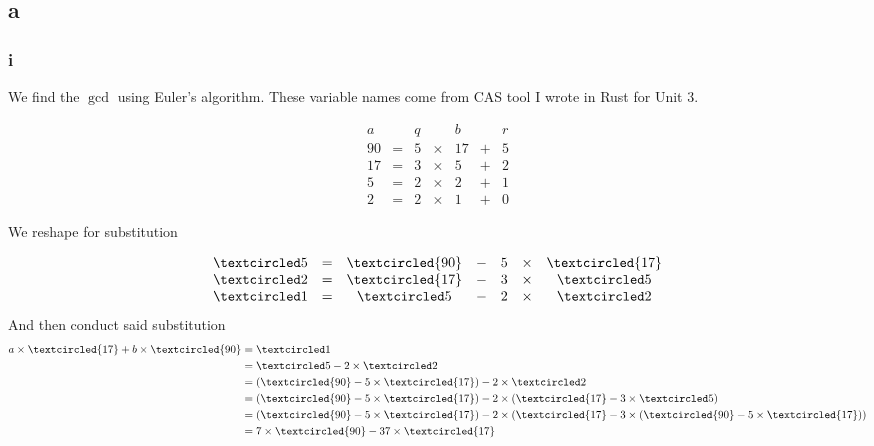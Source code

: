 \documentclass{article}
\begin{document}
\subsection{a}

\subsubsection{i}

We find the $\gcd$ using Euler's algorithm. These variable names come from CAS tool I wrote in Rust for Unit 3.

$$\begin{matrix}
		a  &   & q &        & b  &   & r \\
		90 & = & 5 & \times & 17 & + & 5 \\
		17 & = & 3 & \times & 5  & + & 2 \\
		5  & = & 2 & \times & 2  & + & 1 \\
		2  & = & 2 & \times & 1  & + & 0
	\end{matrix}$$

We reshape for substitution

$$\begin{matrix}
		\textcircled 5 & = & \textcircled {90} & - & 5 & \times & \textcircled {17} \\
		\textcircled 2 & = & \textcircled {17} & - & 3 & \times & \textcircled 5    \\
		\textcircled 1 & = & \textcircled 5    & - & 2 & \times & \textcircled 2
	\end{matrix}$$
And then conduct said substitution
\begin{align*}
	a \times \textcircled {17} + b \times \textcircled {90} & = \textcircled 1                                                                                                                               \\
	                                                        & = \textcircled 5     -  2  \times \textcircled 2                                                                                               \\
	                                                        & = (\textcircled {90}  -  5  \times  \textcircled {17})-  2  \times \textcircled 2                                                              \\
	                                                        & = (\textcircled {90}  -  5  \times  \textcircled {17})-  2  \times (\textcircled {17} - 3 \times \textcircled 5)                               \\
	                                                        & = (\textcircled {90} - 5 \times \textcircled {17}) - 2 \times (\textcircled {17} - 3 \times (\textcircled {90} - 5  \times \textcircled {17})) \\
	                                                        & = 7 \times \textcircled {90} - 37  \times \textcircled {17}
\end{align*}
\end{document}
